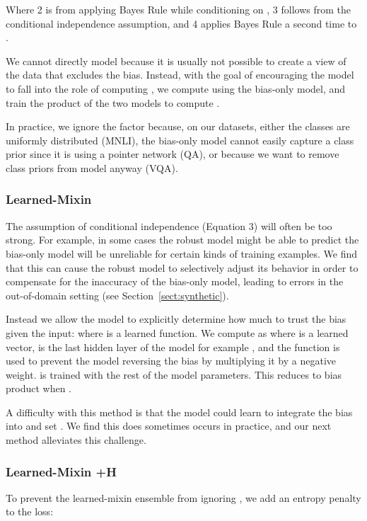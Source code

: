 \documentclass[11pt,a4paper]{article}
\begin{document}
Where 2 is from applying Bayes Rule while conditioning on , 3 follows from the conditional independence assumption, and 4 applies Bayes Rule a second time to .

We cannot directly model  because it is usually not possible to create a view of the data that excludes the bias. 
Instead, with the goal of encouraging the model to fall into the role of computing , we compute  using the bias-only model, and train the product of the two models to compute . 

In practice, we ignore the  factor because, on our datasets, either the classes are uniformly distributed (MNLI), the bias-only model cannot easily capture a class prior since it is using a pointer network (QA), or because we want to remove class priors from model anyway (VQA).

\subsubsection{Learned-Mixin}
The assumption of conditional independence (Equation 3) will often be too strong.
For example, in some cases the robust model might be able to predict the bias-only model will be unreliable for certain kinds of training examples.
We find that this can cause the robust model to selectively adjust its behavior in order to compensate for the inaccuracy of the bias-only model, leading to errors in the out-of-domain setting (see Section~\ref{sect:synthetic}).

Instead we allow the model to explicitly determine how much to trust the bias given the input:  
where  is a learned function. We compute  as  where  is a learned vector,  is the last hidden layer of the model for example , and the  function is used to prevent the model reversing the bias by multiplying it by a negative weight.  is trained with the rest of the model parameters. This reduces to bias product when .

A difficulty with this method is that the model could learn to integrate the bias into  and set .
We find this does sometimes occurs in practice, and our next method alleviates this challenge.


\subsubsection{Learned-Mixin +H}
To prevent the learned-mixin ensemble from ignoring , we add an entropy penalty to the loss:

 
\end{document}
